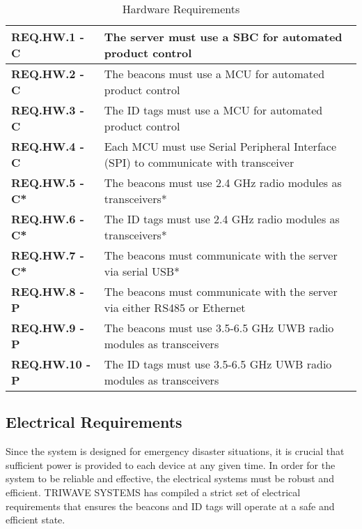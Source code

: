 \bgroup
\def\arraystretch{1.5}
\begin{table}[H]
\centering
\begin{tabular}{ | m{3.25cm} | m{12.5cm} |} 
 \hline
 \textbf{REQ.HW.1 - C} & The server must use a SBC for automated product control \\ 
\hline
 \textbf{REQ.HW.2 - C} & The beacons must use a MCU for automated product control \\ 
\hline
 \textbf{REQ.HW.3 - C} & The ID tags must use a MCU for automated product control \\ 
\hline
 \textbf{REQ.HW.4 - C} & Each MCU must use Serial Peripheral Interface (SPI) to communicate with transceiver \\
\hline
 \textbf{REQ.HW.5 - C*} & The beacons must use 2.4 GHz radio modules as transceivers* \\
\hline
 \textbf{REQ.HW.6 - C*} & The ID tags must use 2.4 GHz radio modules as transceivers*  \\
\hline
 \textbf{REQ.HW.7 - C*} & The beacons must communicate with the server via serial USB* \\
\hline
 \textbf{REQ.HW.8 - P} & The beacons must communicate with the server via either RS485 or Ethernet  \\
\hline
 \textbf{REQ.HW.9 - P} & The beacons must use 3.5-6.5 GHz UWB radio modules as transceivers \\
\hline
 \textbf{REQ.HW.10 - P} & The ID tags must use 3.5-6.5 GHz UWB radio modules as transceivers \\
\hline
\end{tabular}
\caption{Hardware Requirements}
\end{table}	

\break
\subsection{Electrical Requirements}
Since the system is designed for emergency disaster situations, it is crucial that sufficient power is provided to each device at any given time. In order for the system to be reliable and effective, the electrical systems must be robust and efficient. TRIWAVE SYSTEMS has compiled a strict set of electrical requirements that ensures the beacons and ID tags will operate at a safe and efficient state. 

\bigskip

